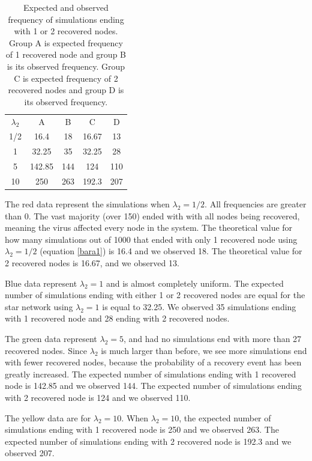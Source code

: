 \documentclass[12pt]{article} %
\numberwithin{equation}{section}
\begin{document}
\begin{table}
    \centering
   \begin{tabular}{c|c|c|c|c}
     $\lambda_2$&  A& B& C&D\\
     1/2& 16.4& 18&16.67&13 \\
     1& 32.25&35&32.25&28 \\
     5& 142.85&144 &124&110  \\
     10& 250& 263 &192.3&207 \\
\end{tabular} 
    \label{tablestarsir}
    \caption{Expected and observed frequency of simulations ending with 1 or 2 recovered nodes. Group A is expected frequency of 1 recovered node and group B is its observed frequency. Group C is expected frequency of 2 recovered nodes and group D is its observed frequency.}
\end{table}
The red data represent the simulations when $\lambda_2 = 1/2$. All frequencies are greater than 0. The vast majority (over 150) ended with with all nodes being recovered, meaning the virus affected every node in the system. The theoretical value for how many simulations out of 1000 that ended with only 1 recovered node using $\lambda_2 = 1/2$ (equation \ref{bara1}) is 16.4 and we observed 18. The theoretical value for 2 recovered nodes is 16.67, and we observed 13. 

Blue data represent $\lambda_2 = 1$ and is almost completely uniform. The expected number of simulations ending with either 1 or 2 recovered nodes are equal for the star network using $\lambda_2 = 1$ is equal to 32.25. We observed 35 simulations ending with 1 recovered node and 28 ending with 2 recovered nodes.

The green data represent $\lambda_2=5$, and had no simulations end with more than 27 recovered nodes. Since $\lambda_2$ is much larger than before, we see more simulations end with fewer recovered nodes, because the probability of a recovery event has been greatly increased. The expected number of simulations ending with 1 recovered node is 142.85 and we observed 144. The expected number of simulations ending with 2 recovered node is 124 and we observed 110.


The yellow data are for $\lambda_2 = 10$. When $\lambda_2 = 10$, the expected number of simulations ending with 1 recovered node is 250 and we observed 263. The expected number of simulations ending with 2 recovered node is 192.3 and we observed 207.
\end{document}
